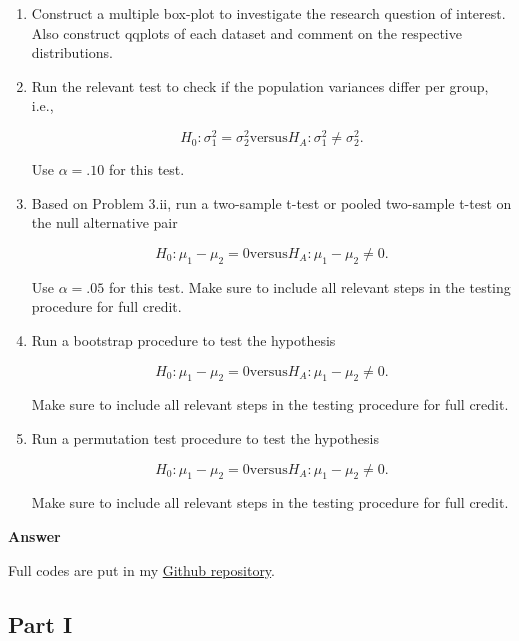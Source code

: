 \documentclass[letterpaper]{article}
\begin{document}
		\begin{enumerate}
			
			\item[i] Construct a multiple box-plot to investigate the research question of interest. Also construct qqplots of each dataset and comment on the respective distributions.
			
			\item[ii] Run the relevant test to check if the population variances differ per group, i.e.,
			
			\[
			H_0 : \sigma_1^2 = \sigma_2^2
			\text{versus} 
			H_A : \sigma_1^2 \ne \sigma_2^2.
			\]
			
			Use $\alpha = .10$ for this test.
			
			\item[iii] Based on Problem 3.ii, run a two-sample t-test or pooled two-sample t-test on the null alternative pair
			
			\[
			H_0 : \mu_1 - \mu_2 = 0
			\text{versus} 
			H_A : \mu_1 - \mu_2 \ne 0.
			\]
			
			Use $\alpha = .05$ for this test. Make sure to include all relevant steps in the testing procedure for full credit.
			
			\item[iv] Run a bootstrap procedure to test the hypothesis
			
			\[
			H_0 : \mu_1 - \mu_2 = 0
			\text{versus} 
			H_A : \mu_1 - \mu_2 \ne 0.
			\]
			
			Make sure to include all relevant steps in the testing procedure for full credit.
			
			\item[v] Run a permutation test procedure to test the hypothesis
			
			\[
			H_0 : \mu_1 - \mu_2 = 0
			\text{versus} 
			H_A : \mu_1 - \mu_2 \ne 0.
			\]
			
			Make sure to include all relevant steps in the testing procedure for full credit.
			
		\end{enumerate}
		
		\textbf{Answer}
		
		Full codes are put in my \href{https://github.com/zongyiliu/STAT_5291/tree/main/Homework/Homework_2}{Github repository}.
		
		\subsection{Part I}
		
\end{document}
